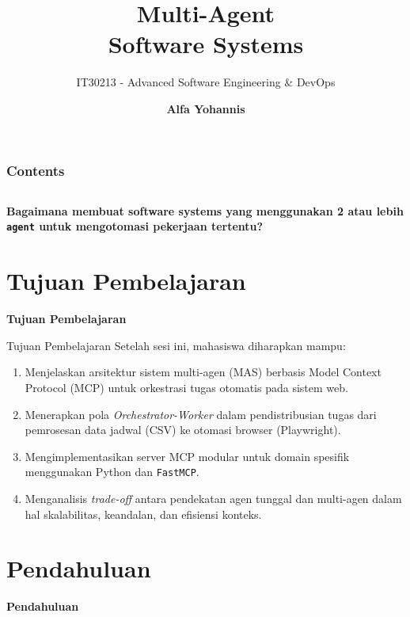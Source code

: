 \documentclass[aspectratio=169, table]{beamer}
\subtitle{IT30213 - Advanced Software Engineering \& DevOps}
\title{\Huge Multi-Agent\vspace{8pt}\\
	Software Systems}
\author{\textbf{Alfa Yohannis}}
\begin{document}
\frame{\titlepage}

\begin{frame}[fragile]
	\frametitle{Contents}
	\vspace{20pt}
	\begin{columns}[t]
		\tableofcontents[sections={1-5}]

		\tableofcontents[sections={6-10}]
	\end{columns}
\end{frame}

\begin{frame}{\hfill}
	\centering
	\Huge{\textbf{Bagaimana membuat software systems yang menggunakan 2 atau lebih \texttt{agent} untuk mengotomasi pekerjaan tertentu?}}
\end{frame}

\section{Tujuan Pembelajaran}
\begin{frame}{\hfill}
	\centering
	\Huge{\textbf{Tujuan Pembelajaran}}
\end{frame}

\begin{frame}{Tujuan Pembelajaran}
\vspace{6pt}
Setelah sesi ini, mahasiswa diharapkan mampu:
\begin{enumerate}
  \item Menjelaskan arsitektur sistem multi-agen (MAS) berbasis Model Context Protocol (MCP) untuk orkestrasi tugas otomatis pada sistem web.
  \item Menerapkan pola \textit{Orchestrator-Worker} dalam pendistribusian tugas dari pemrosesan data jadwal (CSV) ke otomasi browser (Playwright).
  \item Mengimplementasikan server MCP modular untuk domain spesifik menggunakan Python dan \texttt{FastMCP}.
  \item Menganalisis \textit{trade-off} antara pendekatan agen tunggal dan multi-agen dalam hal skalabilitas, keandalan, dan efisiensi konteks.
\end{enumerate}
\end{frame}

\section{Pendahuluan}
\begin{frame}{\hfill}
	\centering
	\Huge{\textbf{Pendahuluan}}
\end{frame}
\end{document}
